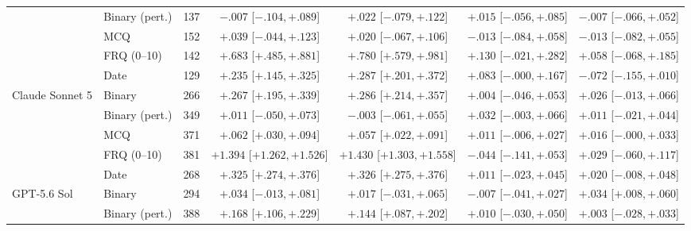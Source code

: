 \begin{table}[p]
\begin{tabular}{l l r c c c c}
& Binary (pert.)
& 137
& $-.007$ {\tiny[$-.104,+.089$]}
& $+.022$ {\tiny[$-.079,+.122$]}
& $+.015$ {\tiny[$-.056,+.085$]}
& $-.007$ {\tiny[$-.066,+.052$]} \\


& MCQ
& 152
& $+.039$ {\tiny[$-.044,+.123$]}
& $+.020$ {\tiny[$-.067,+.106$]}
& $-.013$ {\tiny[$-.084,+.058$]}
& $-.013$ {\tiny[$-.082,+.055$]} \\


& FRQ (0--10)
& 142
& $+.683$ {\tiny[$+.485,+.881$]}
& $+.780$ {\tiny[$+.579,+.981$]}
& $+.130$ {\tiny[$-.021,+.282$]}
& $+.058$ {\tiny[$-.068,+.185$]} \\


& Date
& 129
& $+.235$ {\tiny[$+.145,+.325$]}
& $+.287$ {\tiny[$+.201,+.372$]}
& $+.083$ {\tiny[$-.000,+.167$]}
& $-.072$ {\tiny[$-.155,+.010$]} \\

\addlinespace

Claude Sonnet 5
& Binary
& 266
& $+.267$ {\tiny[$+.195,+.339$]}
& $+.286$ {\tiny[$+.214,+.357$]}
& $+.004$ {\tiny[$-.046,+.053$]}
& $+.026$ {\tiny[$-.013,+.066$]} \\


& Binary (pert.)
& 349
& $+.011$ {\tiny[$-.050,+.073$]}
& $-.003$ {\tiny[$-.061,+.055$]}
& $+.032$ {\tiny[$-.003,+.066$]}
& $+.011$ {\tiny[$-.021,+.044$]} \\


& MCQ
& 371
& $+.062$ {\tiny[$+.030,+.094$]}
& $+.057$ {\tiny[$+.022,+.091$]}
& $+.011$ {\tiny[$-.006,+.027$]}
& $+.016$ {\tiny[$-.000,+.033$]} \\


& FRQ (0--10)
& 381
& $+1.394$ {\tiny[$+1.262,+1.526$]}
& $+1.430$ {\tiny[$+1.303,+1.558$]}
& $-.044$ {\tiny[$-.141,+.053$]}
& $+.029$ {\tiny[$-.060,+.117$]} \\


& Date
& 268
& $+.325$ {\tiny[$+.274,+.376$]}
& $+.326$ {\tiny[$+.275,+.376$]}
& $+.011$ {\tiny[$-.023,+.045$]}
& $+.020$ {\tiny[$-.008,+.048$]} \\

\addlinespace

GPT-5.6 Sol
& Binary
& 294
& $+.034$ {\tiny[$-.013,+.081$]}
& $+.017$ {\tiny[$-.031,+.065$]}
& $-.007$ {\tiny[$-.041,+.027$]}
& $+.034$ {\tiny[$+.008,+.060$]} \\


& Binary (pert.)
& 388
& $+.168$ {\tiny[$+.106,+.229$]}
& $+.144$ {\tiny[$+.087,+.202$]}
& $+.010$ {\tiny[$-.030,+.050$]}
& $+.003$ {\tiny[$-.028,+.033$]} \\



\end{tabular}
\end{table}
